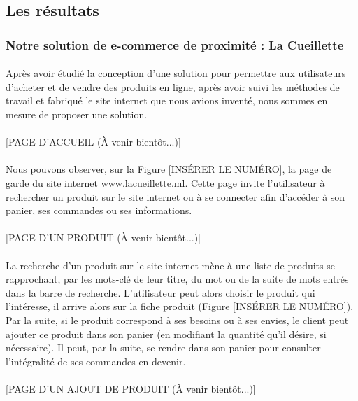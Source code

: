 \documentclass[a4paper, 12pt]{article}
\begin{document}
\subsection{Les résultats}
\subsubsection{Notre solution de e-commerce de proximité : La Cueillette}

\paragraph{}Après avoir étudié la conception d’une solution pour permettre aux utilisateurs d’acheter et de vendre des produits en ligne, après avoir suivi les méthodes de travail et fabriqué le site internet que nous avions inventé, nous sommes en mesure de proposer une solution.
\paragraph{}[PAGE D’ACCUEIL (À venir bientôt...)]
\paragraph{}Nous pouvons observer, sur la Figure [INSÉRER LE NUMÉRO], la page de garde du site internet \href{https://www.lacueillette.ml}{www.lacueillette.ml}. Cette page invite l’utilisateur à rechercher un produit sur le site internet ou à se connecter afin d’accéder à son panier, ses commandes ou ses informations.
\paragraph{}[PAGE D’UN PRODUIT (À venir bientôt...)]
\paragraph{}La recherche d’un produit sur le site internet mène à une liste de produits se rapprochant, par les mots-clé de leur titre, du mot ou de la suite de mots entrés dans la barre de recherche. L’utilisateur peut alors choisir le produit qui l’intéresse, il arrive alors sur la fiche produit (Figure [INSÉRER LE NUMÉRO]). Par la suite, si le produit correspond à ses besoins ou à ses envies, le client peut ajouter ce produit dans son panier (en modifiant la quantité qu’il désire, si nécessaire). Il peut, par la suite, se rendre dans son panier pour consulter l’intégralité de ses commandes en devenir.
\paragraph{}[PAGE D’UN AJOUT DE PRODUIT (À venir bientôt...)]
\end{document}
